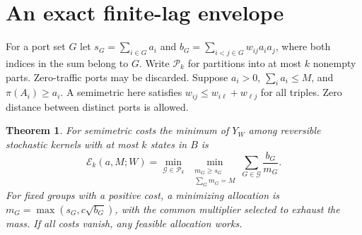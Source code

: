\documentclass[11pt]{article}
\newtheorem{theorem}{Theorem}
\newcommand{\E}{\mathcal E}
\begin{document}
\section{An exact finite-lag envelope}
For a port set \(G\) let \(s_G=\sum_{i\in G}a_i\) and \(b_G=\sum_{i<j\in G}w_{ij}a_i a_j\), where both indices in the sum belong to \(G\). Write \(\mathcal P_k\) for partitions into at most \(k\) nonempty parts. Zero-traffic ports may be discarded. Suppose \(a_i>0\), \(\sum_i a_i\le M\), and \(\pi(A_i)\ge a_i\). A semimetric here satisfies \(w_{ij}\le w_{i\ell}+w_{\ell j}\) for all triples. Zero distance between distinct ports is allowed.
\begin{theorem}\label{thm:finite}
For semimetric costs the minimum of \(Y_W\) among reversible stochastic kernels with at most \(k\) states in \(B\) is
\begin{equation}
 \E_k(a,M;W)=\min_{\mathcal G\in\mathcal P_k}
 \ \min_{\substack{m_G\ge s_G\\\sum_G m_G=M}}
       \sum_{G\in\mathcal G}\frac{b_G}{m_G}.                 \label{eq:finite}
\end{equation}
For fixed groups with a positive cost, a minimizing allocation is
\(m_G=\max(s_G,c\sqrt{b_G})\), with the common multiplier selected to exhaust the mass. If all costs vanish, any feasible allocation works.
\end{theorem}
\end{document}
